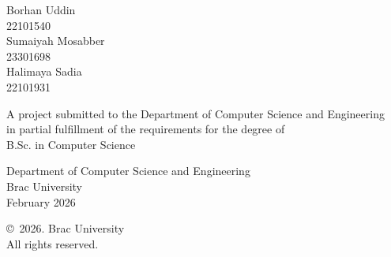 \begin{titlepage}
\renewcommand*{\thepage}{Title} %

    \begin{center} 
        \vspace*{3cm} %
        
        {\fontsize{16pt}{22pt}\selectfont{End-to-End AI Integrated Medical Imaging Report Generation Platform using Retrieval-Augmented Generation (RAG)  \\
      }
        } %
        
        \vspace{1.5cm}
        
        
        \vspace{0.5cm}
        
        	Borhan Uddin\\
	        22101540\\
	        Sumaiyah Mosabber\\
	        23301698\\
	        Halimaya Sadia\\
	        22101931\\

        \vspace{1.5cm}
        
        	A project submitted to the Department of Computer Science and Engineering\\
            in partial fulfillment of the requirements for the degree of\\
            B.Sc. in Computer Science

        
        \vspace{2.5cm}
        
    		Department of Computer Science and Engineering\\
            Brac University\\
            February 2026
        
        \vspace{3cm}
        
    		\copyright\ 2026. Brac University\\
            All rights reserved.
    
    \end{center}

\end{titlepage}